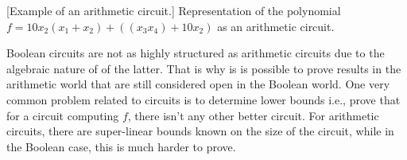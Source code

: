 \begin{center}
  \centering
  
  [Example of an arithmetic circuit.]{
    Representation of the polynomial $f = 10x_2 (x_1 + x_2) + ((x_3 x_4)
    + 10x_2)$ as an arithmetic circuit.\label{fig:ac}
  }
\end{center}

Boolean circuits are not as highly structured as arithmetic circuits due to the
algebraic nature of of the latter.
That is why is is possible to prove results in the arithmetic world that are
still considered open in the Boolean world.
One very common problem related to circuits is to determine lower bounds i.e.,
prove that for a circuit computing $f$, there isn't any other better circuit.
For arithmetic circuits, there are super-linear bounds known on the size of the
circuit, while in the Boolean case, this is much harder to prove.

%

